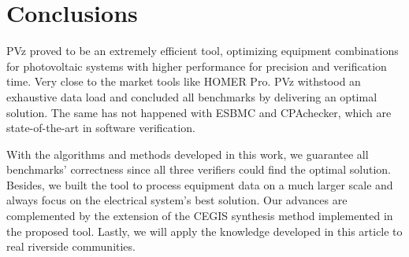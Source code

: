 \documentclass[10pt,journal,compsoc]{IEEEtran}
\begin{document}
\section{Conclusions} 

PVz proved to be an extremely efficient tool, optimizing equipment combinations for photovoltaic systems with higher performance for precision and verification time. Very close to the market tools like HOMER Pro. PVz withstood an exhaustive data load and concluded all benchmarks by delivering an optimal solution. The same has not happened with ESBMC and CPAchecker, which are state-of-the-art in software verification.

With the algorithms and methods developed in this work, we guarantee all benchmarks' correctness since all three verifiers could find the optimal solution. Besides, we built the tool to process equipment data on a much larger scale and always focus on the electrical system's best solution. Our advances are complemented by the extension of the CEGIS synthesis method implemented in the proposed tool. Lastly, we will apply the knowledge developed in this article to real riverside communities.
%
\end{document}
